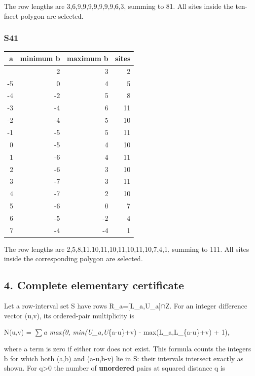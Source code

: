 \documentclass[
]{article}
\begin{document}
The row lengths are 3,6,9,9,9,9,9,9,9,6,3, summing to 81. All sites
inside the ten-facet polygon are selected.

\subsubsection{S41}\label{s41}

\begin{longtable}[]{@{}rrrr@{}}
\toprule\noalign{}
a & minimum b & maximum b & sites \\
\midrule\noalign{}
\endhead
\bottomrule\noalign{}
\endlastfoot
-6 & 2 & 3 & 2 \\
-5 & 0 & 4 & 5 \\
-4 & -2 & 5 & 8 \\
-3 & -4 & 6 & 11 \\
-2 & -4 & 5 & 10 \\
-1 & -5 & 5 & 11 \\
0 & -5 & 4 & 10 \\
1 & -6 & 4 & 11 \\
2 & -6 & 3 & 10 \\
3 & -7 & 3 & 11 \\
4 & -7 & 2 & 10 \\
5 & -6 & 0 & 7 \\
6 & -5 & -2 & 4 \\
7 & -4 & -4 & 1 \\
\end{longtable}

The row lengths are 2,5,8,11,10,11,10,11,10,11,10,7,4,1, summing to 111.
All sites inside the corresponding polygon are selected.

\subsection{4. Complete elementary
certificate}\label{complete-elementary-certificate}

Let a row-interval set S have rows R\_a={[}L\_a,U\_a{]}\ensuremath{\cap}Z. For an
integer difference vector (u,v), its ordered-pair multiplicity is

N(u,v) = \ensuremath{\sum}\emph{a max(0, min(U\_a,U}\{a-u\}+v) - max(L\_a,L\_\{a-u\}+v)
+ 1),

where a term is zero if either row does not exist. This formula counts
the integers b for which both (a,b) and (a-u,b-v) lie in S: their
intervals intersect exactly as shown. For q\textgreater0 the number of
\textbf{unordered} pairs at squared distance q is
\end{document}
